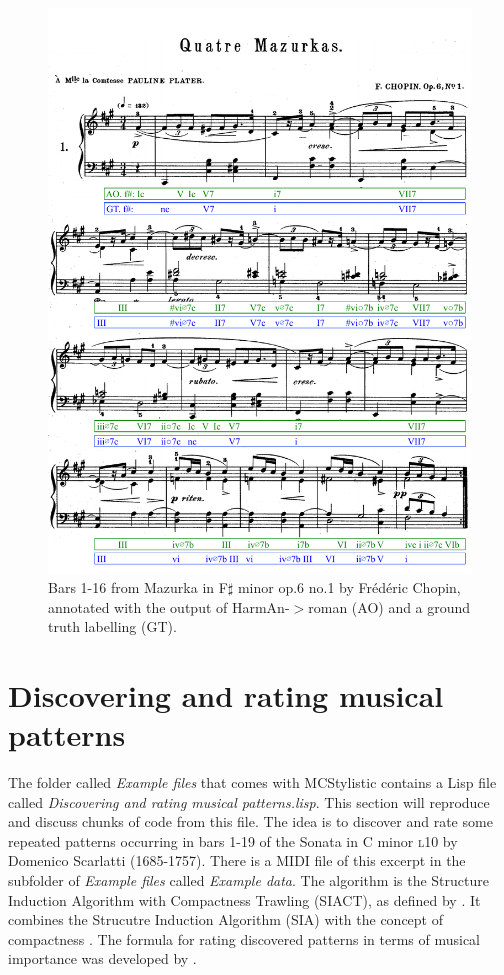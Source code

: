 \begin{figure}[htbp!]
\begin{center}
\includegraphics[width=0.9\columnwidth]{"Example code/figs/mazurka06-1"}
\end{center}
\caption[Bars 1-16 from Mazurka in F$\sharp$ minor op.6 no.1 by Fr\'ed\'eric Chopin, annotated with the output of HarmAn-$>$roman (AO) and a ground truth labelling (GT).]{Bars 1-16 from Mazurka in F$\sharp$ minor op.6 no.1 by Fr\'ed\'eric Chopin, annotated with the output of HarmAn-$>$roman (AO) and a ground truth labelling (GT).}
\label{fig:tallis}
\end{figure}

\section{Discovering and rating musical patterns}\label{sec:disc&rate-musical-patterns}

The folder called \emph{Example files} that comes with MCStylistic contains a Lisp file called \emph{Discovering and rating musical patterns.lisp}. This section will reproduce and discuss chunks of code from this file. The idea is to discover and rate some repeated patterns occurring in bars 1-19 of the Sonata in C minor \textsc{l}10 by Domenico Scarlatti (1685-1757). There is a MIDI file of this excerpt in the subfolder of \emph{Example files} called \emph{Example data}. The algorithm is the Structure Induction Algorithm with Compactness Trawling (SIACT), as defined by \citet*{collins2010b}. It combines the Strucutre Induction Algorithm (SIA) with the concept of compactness \citep*{meredith2002,meredith2003}. The formula for rating discovered patterns in terms of musical importance was developed by \citet*{collins2011a}.

